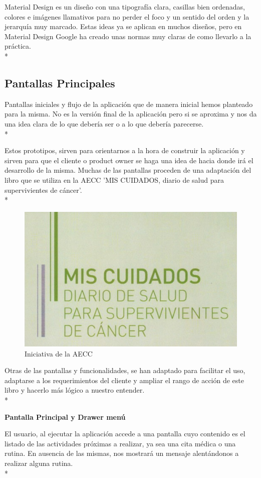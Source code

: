\documentclass[../pfc.tex]{subfiles}
\begin{document}
		Material Design es un diseño con una tipografía clara, casillas bien ordenadas, colores e imágenes llamativos para no perder el foco y un sentido del orden y la jerarquía muy marcado. Estas ideas ya se aplican en muchos diseños, pero en Material Design Google ha creado unas normas muy claras de como llevarlo a la práctica.\\*
		
		\subsection{Pantallas Principales}
		
		Pantallas iniciales y flujo de la aplicación que de manera inicial hemos planteado para la misma.
		No es la versión final de la aplicación pero si se aproxima y nos da una idea clara de lo que debería ser o a lo que debería parecerse.\\*
		
		Estos prototipos, sirven para orientarnos a la hora de construir la aplicación y sirven para que el cliente o product owner se haga una idea de hacia donde irá el desarrollo de la misma. Muchas de las pantallas proceden de una adaptación del libro que se utiliza en la AECC 'MIS CUIDADOS, diario de salud para supervivientes de cáncer'.\\*
		
		\begin{figure}[H]
			\centering
			\includegraphics[width=0.4\linewidth]{../folleto/001_corto}
			\caption{Iniciativa de la AECC}
			\label{fig:001corto}
		\end{figure}
		
		Otras de las pantallas y funcionalidades, se han adaptado para facilitar el uso, adaptarse a los requerimientos del cliente y ampliar el rango de acción de este libro y hacerlo más lógico a nuestro entender.\\*
		
		
		
		\textbf{Pantalla Principal y Drawer menú}
		
		El usuario, al ejecutar la aplicación accede a una pantalla cuyo contenido es el listado de las actividades próximas a realizar, ya sea una cita médica o una rutina. En ausencia de las mismas, nos mostrará un mensaje alentándonos a realizar alguna rutina.\\*
		
\end{document}

